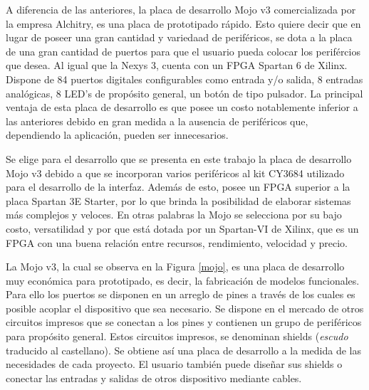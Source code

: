 A diferencia de las anteriores, la placa de desarrollo Mojo v3 comercializada por la empresa Alchitry, es una placa de prototipado rápido. Esto quiere decir que en lugar de poseer una gran cantidad y variedaad de periféricos, se dota a la placa de una gran cantidad de puertos para que el usuario pueda colocar los perifércios que desea. Al igual que la Nexys 3, cuenta con un FPGA Spartan 6 de Xilinx. Dispone de 84 puertos digitales configurables como entrada y/o salida, 8 entradas analógicas, 8 LED's de propósito general, un botón de tipo pulsador. La principal ventaja de esta placa de desarrollo es que posee un costo notablemente inferior a las anteriores debido en gran medida a la ausencia de periféricos que, dependiendo la aplicación, pueden ser innecesarios.

Se elige para el desarrollo que se presenta en este trabajo la placa de desarrollo Mojo v3 debido a que se incorporan varios periféricos al kit CY3684 utilizado para el desarrollo de la interfaz. Además de esto, posee un FPGA superior a la placa Spartan 3E Starter, por lo que brinda la posibilidad de elaborar sistemas más complejos y veloces. En otras palabras la Mojo se selecciona por su bajo costo, versatilidad y por que está dotada por un Spartan-VI de Xilinx, que es un FPGA con una buena relación entre recursos, rendimiento, velocidad y precio.
%


La Mojo v3, la cual se observa en la Figura \ref{mojo}, es una placa de desarrollo muy económica para prototipado, es decir, la fabricación de modelos funcionales. Para ello los puertos se disponen en un arreglo de pines a través de los cuales es posible acoplar el dispositivo que sea necesario. Se dispone en el mercado de otros circuitos impresos que se conectan a los pines y contienen un grupo de periféricos para propósito general. Estos circuitos impresos, se denominan shields (\textit{escudo} traducido al castellano). Se obtiene así una placa de desarrollo a la medida de las necesidades de cada proyecto. El usuario también puede diseñar sus shields o conectar las entradas y salidas de otros dispositivo mediante cables.%

